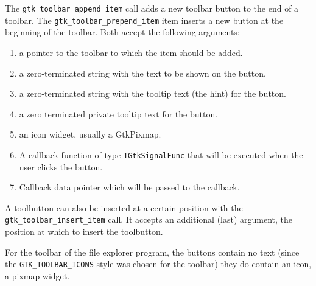 \documentclass[10pt]{article}
\begin{document}
The \lstinline|gtk_toolbar_append_item| call adds a new toolbar button 
to the end of a toolbar. The \lstinline|gtk_toolbar_prepend_item| item 
inserts a new button at the beginning of the toolbar. Both accept the 
following arguments:
\begin{enumerate}
\item a pointer to the toolbar to which the item should be added.
\item a zero-terminated string with the text to be shown on the button.
\item a zero-terminated string with the tooltip text (the hint) for the button.
\item a zero terminated private tooltip text for the button.
\item an icon widget, usually a GtkPixmap.
\item A callback function of type \lstinline|TGtkSignalFunc| that will be 
executed when the user clicks the button.
\item Callback data pointer which will be passed to the callback.
\end{enumerate}
A toolbutton can also be inserted at a certain position with the
\lstinline|gtk_toolbar_insert_item| call. It accepts an additional (last) 
argument, the position at which to insert the toolbutton. 

For the toolbar of the file explorer program, the buttons contain no text
(since the \lstinline|GTK_TOOLBAR_ICONS| style was chosen for the toolbar)
they do contain an icon, a pixmap widget.
\end{document}
